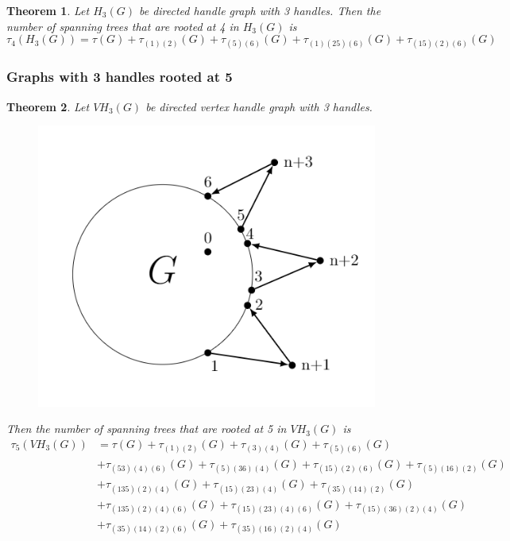 \documentclass[twoside,11pt]{article}
\newtheorem{theorem}{Theorem}[section]
\numberwithin{equation}{section} \DeclareMathOperator{\Var}{Var}
\newcommand{\bthm}{\begin{theorem}}
\newcommand{\ethm}{\end{theorem}}
\begin{document}
\bthm
Let $H_3(G)$ be directed handle graph with 3 handles. Then the number of spanning trees that are rooted at 4 in $H_3(G)$ is
\[
\tau_4(H_3(G)) = \tau(G) + \tau_{(1)(2)}(G)+ \tau_{(5)(6)}(G) + \tau_{(1)(25)(6)}(G)+ \tau_{(15)(2)(6)}(G)
\]
\ethm

\subsubsection{Graphs with 3 handles rooted at 5}
\bthm
Let $VH_3(G)$ be directed vertex handle graph with 3 handles.
\begin{figure}[H]
    \centering
    \includegraphics[scale=0.4]{tik_3handles.PNG}
\end{figure}
Then the number of spanning trees that are rooted at 5 in $VH_3(G)$ is
\begin{equation*}
    \begin{split}
        \tau_5(VH_3(G)) &= \tau(G) + \tau_{(1)(2)}(G)+ \tau_{(3)(4)}(G) + \tau_{(5)(6)}(G)\\ 
        &+ \tau_{(53)(4)(6)}(G) + \tau_{(5)(36)(4)}(G) + \tau_{(15)(2)(6)}(G) + \tau_{(5)(16)(2)}(G)\\
        &+ \tau_{(135)(2)(4)}(G) + \tau_{(15)(23)(4)}(G) + \tau_{(35)(14)(2)}(G)\\
        &+ \tau_{(135)(2)(4)(6)}(G) + \tau_{(15)(23)(4)(6)}(G) + \tau_{(15)(36)(2)(4)}(G)\\
&+ \tau_{(35)(14)(2)(6)}(G) + \tau_{(35)(16)(2)(4)}(G)
    \end{split}
\end{equation*}
\ethm
\end{document}

